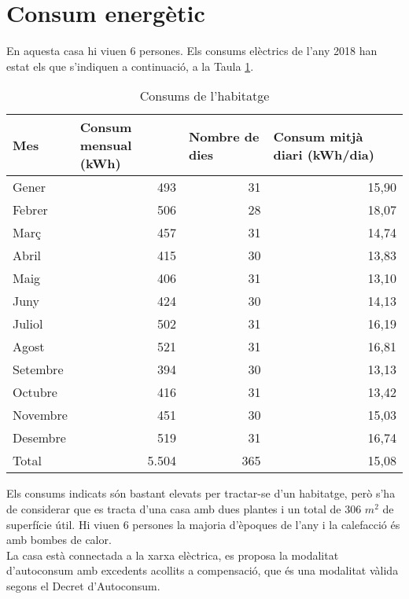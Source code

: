 \section{Consum energètic}
\noindent En aquesta casa hi viuen 6 persones. Els consums elèctrics de l'any 2018 han estat els que s'indiquen a continuació, a la Taula \ref{tab:consums}.

\begin{table}[H]
\small
  \centering
    \begin{tabular}{|l|r|r|r|} \hline
    Mes   & \multicolumn{1}{|l}{Consum mensual (kWh)} & \multicolumn{1}{|l}{Nombre de dies} & \multicolumn{1}{|l|}{Consum mitjà diari (kWh/dia)} \\ \hline \hline
    Gener & 493   & 31    & 15,90 \\ \hline
    Febrer & 506   & 28    & 18,07 \\ \hline
    Març  & 457   & 31    & 14,74 \\ \hline
    Abril & 415   & 30    & 13,83 \\ \hline
    Maig  & 406   & 31    & 13,10 \\ \hline
    Juny  & 424   & 30    & 14,13 \\ \hline
    Juliol & 502   & 31    & 16,19 \\ \hline
    Agost & 521   & 31    & 16,81 \\ \hline
    Setembre & 394   & 30    & 13,13 \\ \hline
    Octubre & 416   & 31    & 13,42 \\ \hline
    Novembre & 451   & 30    & 15,03 \\ \hline
    Desembre & 519   & 31    & 16,74 \\ \hline
    Total & 5.504 & 365   & 15,08 \\ \hline
    \end{tabular}%
  \label{tab:addlabel}%
    \caption{Consums de l'habitatge}
    \label{tab:consums}
\end{table}%

\noindent Els consums indicats són bastant elevats per tractar-se d'un habitatge, però s'ha de considerar que es tracta d'una casa amb dues plantes i un total de 306 $m^2$ de superfície útil. Hi viuen 6 persones la majoria d'èpoques de l'any i la calefacció és amb bombes de calor.\\
\newline La casa està connectada a la xarxa elèctrica, es proposa la modalitat d'autoconsum amb excedents acollits a compensació, que és una modalitat vàlida segons el Decret d'Autoconsum.


